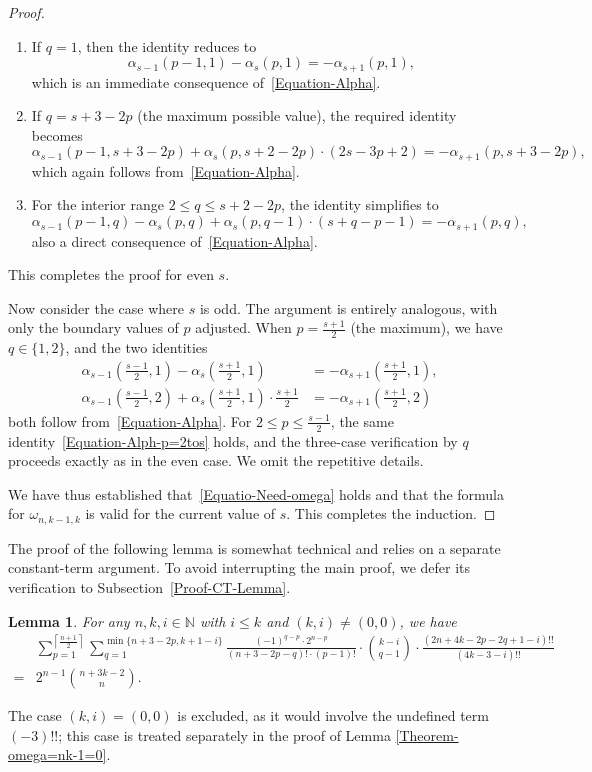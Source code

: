 \documentclass[reqno, 12pt]{article}
\newtheorem{lem}[thm]{Lemma}
\theoremstyle{mydefinition}
\theoremstyle{myremark}
\numberwithin{algorithm}{section}
\begin{document}
\begin{proof}
\begin{enumerate}
\item If $q=1$, then the identity reduces to
\[
\alpha_{s-1}(p-1,1)-\alpha_s(p,1)=-\alpha_{s+1}(p,1),
\]
which is an immediate consequence of~\eqref{Equation-Alpha}.

\item If $q=s+3-2p$ (the maximum possible value), the required identity becomes
\[
\alpha_{s-1}(p-1,s+3-2p)+\alpha_s(p,s+2-2p)\cdot (2s-3p+2)=-\alpha_{s+1}(p,s+3-2p),
\]
which again follows from~\eqref{Equation-Alpha}.

\item For the interior range $2\leq q\leq s+2-2p$, the identity simplifies to
\[
\alpha_{s-1}(p-1,q)-\alpha_s(p,q)+\alpha_s(p,q-1)\cdot (s+q-p-1)=-\alpha_{s+1}(p,q),
\]
also a direct consequence of~\eqref{Equation-Alpha}.
\end{enumerate}

This completes the proof for even $s$.

Now consider the case where $s$ is odd.
The argument is entirely analogous, with only the boundary values of $p$ adjusted.
When $p=\frac{s+1}{2}$ (the maximum), we have $q\in\{1,2\}$, and the two identities
\begin{align*}
\alpha_{s-1}\left(\frac{s-1}{2},1\right)-\alpha_s\left(\frac{s+1}{2},1\right)&=-\alpha_{s+1}\left(\frac{s+1}{2},1\right),\\
\alpha_{s-1}\left(\frac{s-1}{2},2\right)+\alpha_s\left(\frac{s+1}{2},1\right)\cdot \frac{s+1}{2}
&=-\alpha_{s+1}\left(\frac{s+1}{2},2\right)
\end{align*}
both follow from~\eqref{Equation-Alpha}.
For $2\leq p\leq \frac{s-1}{2}$, the same identity~\eqref{Equation-Alph-p=2tos} holds, and the three-case verification by $q$ proceeds exactly as in the even case.
We omit the repetitive details.

We have thus established that~\eqref{Equatio-Need-omega} holds and that the formula for $\omega_{n,k-1,k}$ is valid for the current value of $s$.
This completes the induction.
\end{proof}



The proof of the following lemma is somewhat technical and relies on a separate constant-term argument.
To avoid interrupting the main proof, we defer its verification to Subsection~\ref{Proof-CT-Lemma}.

\begin{lem}\label{Lemma-Sum-Free-i}
For any $n, k,i\in \mathbb{N}$ with $i\leq k$ and $(k,i)\neq (0,0)$, we have
\begin{align*}
&\sum_{p=1}^{\left\lceil \frac{n+1}{2}\right\rceil} \sum_{q=1}^{\min\{n+3-2p,k+1-i\}} \frac{(-1)^{q-p}\cdot 2^{n-p}}{(n+3-2p-q)!\cdot (p-1)!} \cdot \binom{k-i}{q-1}\cdot \frac{(2n+4k-2p-2q+1-i)!!}{(4k-3-i)!!}
\\=&2^{n-1}\binom{n+3k-2}{n}.
\end{align*}
\end{lem}
The case $(k,i)=(0,0)$ is excluded, as it would involve the undefined term $(-3)!!$; this case is treated separately in the proof of Lemma \ref{Theorem-omega=nk-1=0}.
\end{document}
